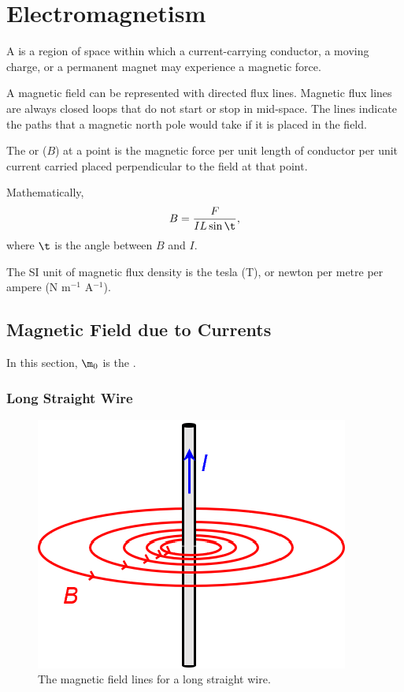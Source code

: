 \chapter{Electromagnetism}

\begin{definition}
    A  is a region of space within which a current-carrying conductor, a moving charge, or a permanent magnet may experience a magnetic force.
\end{definition}

A magnetic field can be represented with directed flux lines. Magnetic flux lines are always closed loops that do not start or stop in mid-space. The lines indicate the paths that a magnetic north pole would take if it is placed in the field.

\begin{definition}
    The  or  ($B$) at a point is the magnetic force per unit length of conductor per unit current carried placed perpendicular to the field at that point.
\end{definition}

Mathematically, \[B = \frac{F}{IL \sin \t},\] where $\t$ is the angle between $B$ and $I$.

The SI unit of magnetic flux density is the tesla (T), or newton per metre per ampere (N m$^{-1}$ A$^{-1}$).

\section{Magnetic Field due to Currents}

In this section, $\m_0$ is the .

\subsection{Long Straight Wire}

\begin{figure}[H]
    \centering
    \includegraphics{media/Magnetic Field Lines - Straight Wire.png}
    \caption{The magnetic field lines for a long straight wire.\protect\footnotemark}
\end{figure}

